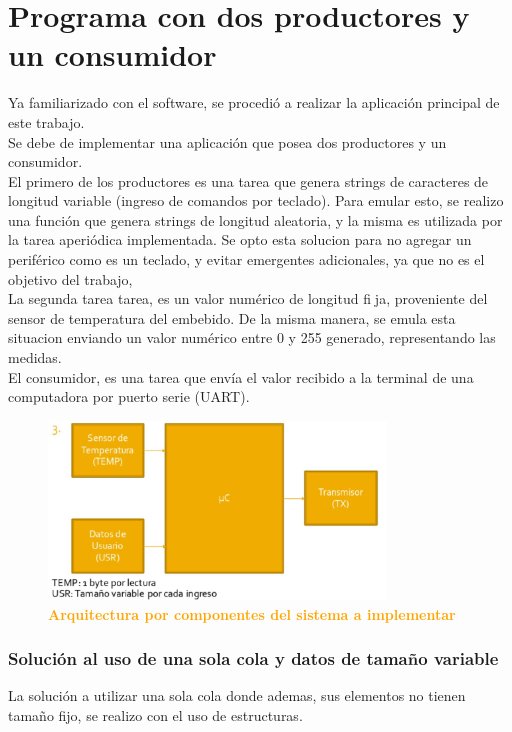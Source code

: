 \documentclass{article}
\begin{document}
\clearpage
\section{Programa con dos productores y un consumidor}
Ya familiarizado con el software, se procedió a realizar la aplicación principal de este trabajo. \\

Se debe de implementar una aplicación que posea dos productores y un consumidor.\\

El primero de los productores es una tarea que genera strings de caracteres de longitud variable (ingreso de comandos por teclado). Para emular esto, se realizo una función
que genera strings de longitud aleatoria, y la misma es utilizada por la tarea aperiódica implementada. Se opto esta solucion para no agregar un periférico como es un teclado, y evitar emergentes adicionales, ya que no es el objetivo del trabajo, \\

La segunda tarea tarea, es un valor numérico de longitud fija, proveniente del sensor de temperatura del embebido. De la misma manera, se emula esta situacion enviando
un valor numérico entre 0 y 255 generado, representando las medidas. \\

El consumidor, es una tarea que envía el valor recibido a la terminal de una computadora por puerto serie (UART).


\begin{figure}[H]
   \centering
   \includegraphics[width=0.8\textwidth]{figures/arq.jpg}
   \centering
   \caption{\textbf{\textcolor{Orange}{Arquitectura por componentes del sistema a implementar}}}
\end{figure}

\subsubsection{Solución al uso de una sola cola y datos de tamaño variable}
La solución a utilizar una sola cola donde ademas, sus elementos no tienen tamaño fijo, se realizo con el uso de estructuras. \\
\end{document}
